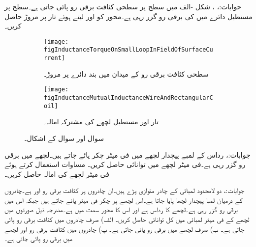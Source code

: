 جوابات:، ، 
شکل -الف میں  سطح پر سطحی کثافت برقی رو  پائی جاتی ہے۔سطح  پر مستطیل دائرے میں  کی برقی رو گزر رہی ہے۔محور کو  اور  لیتے ہوئے تار پر مروڑ حاصل کریں۔
\begin{figure}
\centering
\begin{subfigure}{0.5\textwidth}
\centering
\texttt{[image: figInductanceTorqueOnSmallLoopInFieldOfSurfaceCurrent]}
\caption{سطحی کثافت برقی رو کے میدان میں بند دائرے پر مروڑ۔}
\end{subfigure}%
%
\begin{subfigure}{0.5\textwidth}
\centering
\texttt{[image: figInductanceMutualInductanceWireAndRectangularCoil]}
\caption{تار اور مستطیل لچھے کی مشترکہ امالہ۔}
\end{subfigure}%
\caption{سوال  اور سوال  کے اشکال۔}
\label{شکل_امالہ_سوالات_سطحی_میدان_اور_دائرہ}
\end{figure}

جوابات:، 
رداس  کے لمبے پیچدار لچھے میں فی میٹر  چکر پائے جاتے ہیں۔لچھے میں  برقی رو گزر رہی ہے۔فی میٹر لچھے میں توانائی  حاصل کریں۔ مساوات  استعمال کرتے ہوئے فی میٹر لچھے کی امالہ حاصل کریں۔

جوابات:، 
دو لامحدود لمبائی کے چادر متوازی پڑے ہیں۔ان چادروں پر کثافت برقی رو  اور 
 ہے۔چادروں کے درمیان لمبا پیچدار لچھا پایا جاتا ہے۔اس لچھے پر  چکر فی میٹر پائے جاتے ہیں جبکہ اس میں  برقی رو گزر رہی ہے۔لچھے کا رداس  ہے اور اس کا محور  سمت میں ہے۔مندرجہ ذیل صورتوں میں لچھے کے فی میٹر لمبائی میں کل توانائی حاصل کریں۔ الف) صرف چادروں میں کثافت برقی رو پائی جاتی ہے۔ ب) صرف لچھے میں برقی رو پائی جاتی ہے۔ پ) چادروں میں کثافت برقی رو اور لچھے میں برقی رو پائی جاتی ہے۔

